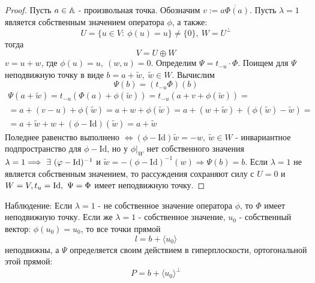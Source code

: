 \begin{proof}
    Пусть $a\in \A$ - произвольная точка. Обозначим $v:=\overline{a\Phi(a)}$. Пусть $\lambda=1$ является собственным значением оператора $\phi$, а также:
    \[U=\{u\in V:\ \phi(u)=u\}\ne \{0\},\ W=U^{\perp}\]
    тогда
    \[V=U\oplus W\]
    $v=u+w$, где $\phi(u)=u,\ (w,u)=0$. Определим $\Psi=t_{-u}\cdot \Phi$. Поищем для $\Psi$ неподвижную точку в виде $b=a+\widetilde{w},\ \widetilde{w}\in W$. Вычислим 
    \[\Psi(b)=(t_{-u}\Phi)(b)\]
    \begin{multline*}
        \Psi(a+\widetilde{w})=t_{-u}(\Phi(a)+\phi(\widetilde{w}))=t_{-u}(a+v+\phi(\widetilde{w}))=\\
        =a+(v-u)+\phi(\widetilde{w})=a+w+\phi(\widetilde{w})=a+(w+\widetilde{w})+(\phi(\widetilde{w})-\widetilde{w})=\\
        =a+\widetilde{w}+w+(\phi-\text{Id})(\widetilde{w})=a+\widetilde{w}
    \end{multline*}
    Поледнее равенство выполнено $\Longleftrightarrow (\phi-\text{Id})\widetilde{w}=-w,\ \widetilde{w}\in W$ - инвариантное подпространство для $\phi-\text{Id}$, но у $\phi|_W$ нет собственного значения $\lambda=1\\
    \Longrightarrow\ \exists\ (\phi-\text{Id})^{-1}$ и $\widetilde{w}=-(\phi-\text{Id})^{-1}(w) \Longrightarrow \Psi(b)=b$. Если $\lambda=1$ не является собственным значением, то рассуждения сохраняют силу с $U=0$ и $W=V,\\
     t_u=\text{Id},\ \Psi=\Phi$ имеет неподвижную точку.
\end{proof}
Наблюдение: Если $\lambda=1$ - не собственное значение оператора $\phi$, то $\Phi$ имеет неподвижную точку. Если же $\lambda =1$ - собственное значение, $u_0$ - собственный вектор: $\phi(u_0)=u_0$, то все точки прямой
\[l=b+\langle u_0 \rangle\] 
неподвижны, а $\Psi$ определяется своим действием в гиперплоскости, ортогональной этой прямой:
\[P=b+\langle u_0 \rangle^{\perp}\]
